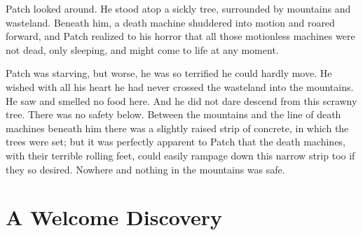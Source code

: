 \documentclass[12pt]{book}
\begin{document}
 Patch looked around. He stood atop a sickly tree, surrounded by mountains and wasteland. Beneath him, a death machine shuddered into motion and roared forward, and Patch realized to his horror that all those motionless machines were not dead, only sleeping, and might come to life at any moment.\par
Patch was starving, but worse, he was so terrified he could hardly move. He wished with all his heart he had never crossed the wasteland into the mountains. He saw and smelled no food here. And he did not dare descend from this scrawny tree. There was no safety below. Between the mountains and the line of death machines beneath him there was a slightly raised strip of concrete, in which the trees were set; but it was perfectly apparent to Patch that the death machines, with their terrible rolling feet, could easily rampage down this narrow strip too if they so desired. Nowhere and nothing in the mountains was safe.\par

\section{A Welcome Discovery}
\end{document}
